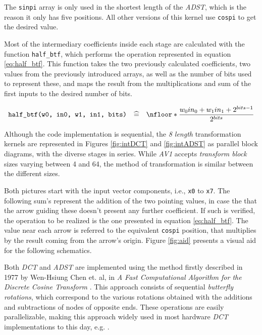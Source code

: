 The \texttt{sinpi} array is only used in the shortest length of the \emph{ADST}, which is the reason it only has five positions. All other versions of this kernel use \texttt{cospi} to get the desired value.

Most of the intermediary coefficients inside each stage are calculated with the function \verb|half_btf|, which performs the operation represented in equation \ref{eq:half_btf}. This function takes the two previously calculated coefficients, two values from the previously introduced arrays, as well as the number of bits used to represent these, and maps the result from the multiplications and sum of the first inputs to the desired number of bits.

\begin{equation} \label{eq:half_btf}
    \texttt{half\_btf(w0, in0, w1, in1, bits)} \quad \widehat{=} \quad \nfloor*{\frac{w_0in_0 + w_1in_1 + 2^{bits -1}}{2^{bits}}}
\end{equation}

Although the code implementation is sequential, the \emph{8 length} transformation kernels are represented in Figures \ref{fig:intDCT} and \ref{fig:intADST} as parallel block diagrams, with the diverse stages in series. While \emph{AV1} accepts \emph{transform block} sizes varying between 4 and 64, the method of transformation is similar between the different sizes.

Both pictures start with the input vector components, i.e., \texttt{x0} to \texttt{x7}. The following sum's represent the addition of the two pointing values, in case the that the arrow guiding these doesn't present any further coefficient. If such is verified, the operation to be realized is the one presented in equation \ref{eq:half_btf}. The value near each arrow is referred to the equivalent \texttt{cospi} position, that multiplies by the result coming from the arrow's origin. Figure \ref{fig:aid} presents a visual aid for the following schematics.

Both \emph{DCT} and \emph{ADST} are implemented using the method firstly described in 1977 by Wen-Hsiung Chen et. al, in \emph{A Fast Computational Algorithm for the Discrete Cosine Transform} \cite{wen-hsiungchenFastComputationalAlgorithm1977}. This approach consists of sequential \emph{butterfly rotations}, which correspond to the various rotations obtained with the additions and subtractions of nodes of opposite ends. These operations are easily parallelizable, making this approach widely used in most hardware \emph{DCT} implementations to this day, e.g. \cite{songPipeliningHardwareImplementation2010, srivastavaFPGAImplementationPipelined2018a, tejaVerilogImplementationFully2015, subramanianVLSIImplementationFully2010}.

